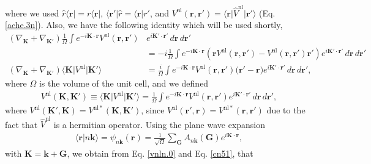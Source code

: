 where we used $\hat{r}\langle\mathbf{r}\vert = r\langle\mathbf{r}\vert$,
$\langle\mathbf{r}'\vert\hat{r} = \langle\mathbf{r}\vert r'$, and
$V^\mathrm{nl}(\mathbf{r},\mathbf{r}') =
\langle\mathbf{r}\vert\hat{V}^\mathrm{nl}\vert\mathbf{r}'\rangle$
(Eq. \eqref{ache.3n}). Also, we have the following identity which will be used
shortly,
\begin{align}\label{cn51}
(\nabla_\mathbf{K}+\nabla_{\mathbf{K}'})\frac{1}{\Omega}\int e^{-i\mathbf{K}\cdot\mathbf{r}}V^\mathrm{nl}(\mathbf{r},\mathbf{r}')&e^{i\mathbf{K}'\cdot\mathbf{r}'}\,d\mathbf{r}\,d\mathbf{r}'\nonumber\\
&= -i \frac{1}{\Omega} \int e^{-i\mathbf{K}\cdot\mathbf{r}} \left(\mathbf{r} V^\mathrm{nl}(\mathbf{r},\mathbf{r}') - V^\mathrm{nl}(\mathbf{r},\mathbf{r}') \mathbf{r}'\right) e^{i\mathbf{K}'\cdot\mathbf{r}'} \,d\mathbf{r}\,d\mathbf{r}'\nonumber\\ (\nabla_\mathbf{K}+\nabla_{\mathbf{K}'}) \langle\mathbf{K}\vert V^\mathrm{nl} \vert\mathbf{K}'\rangle
&= \frac{i}{\Omega} \int e^{-i\mathbf{K}\cdot\mathbf{r}} V^\mathrm{nl}(\mathbf{r},\mathbf{r}') \big(\mathbf{r}'- \mathbf{r} \big) e^{i\mathbf{K}'\cdot\mathbf{r}'} \,d\mathbf{r}\,d\mathbf{r}',
\end{align}
where $\Omega$ is the volume of the unit cell, and we defined
\begin{align}\label{cn52}
V^\mathrm{nl}(\mathbf{K},\mathbf{K}') 
\equiv
\langle\mathbf{K}\vert V^\mathrm{nl} \vert\mathbf{K}'\rangle
= \frac{1}{\Omega} \int e^{-i\mathbf{K}\cdot\mathbf{r}} V^\mathrm{nl}(\mathbf{r},\mathbf{r}') e^{i\mathbf{K}'\cdot\mathbf{r}'} \,d\mathbf{r}\,d\mathbf{r}',
\end{align}
where 
$V^\mathrm{nl}(\mathbf{K}',\mathbf{K}) =V^{\mathrm{nl} *}(\mathbf{K},\mathbf{K}')$, since $V^\mathrm{nl}(\mathbf{r}',\mathbf{r})=V^{\mathrm{nl}*}(\mathbf{r},\mathbf{r}')$ due to the fact that $\hat V^\mathrm{nl}$ is a hermitian operator. Using the plane wave expansion
\begin{align}\label{cn3}
\langle\mathbf{r}\vert n\mathbf{k}\rangle=\psi_{n\mathbf{k}}(\mathbf{r})=\frac{1}{\sqrt{\Omega}} \sum_{\mathbf{G}} A_{n\mathbf{k}}(\mathbf{G})e^{i\mathbf{K}\cdot\mathbf{r}} ,
\end{align}
with $\mathbf{K}=\mathbf{k}+\mathbf{G}$, we obtain from Eq. \eqref{vnln.0} and Eq. \eqref{cn51}, that
